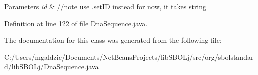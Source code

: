 \begin{DoxyParams}{Parameters}
{\em id} & //note use .setID instead for now, it takes string \\
\hline
\end{DoxyParams}


Definition at line 122 of file DnaSequence.java.



The documentation for this class was generated from the following file:\begin{DoxyCompactItemize}
\item 
C:/Users/mgaldzic/Documents/NetBeansProjects/libSBOLj/src/org/sbolstandard/libSBOLj/DnaSequence.java\end{DoxyCompactItemize}
